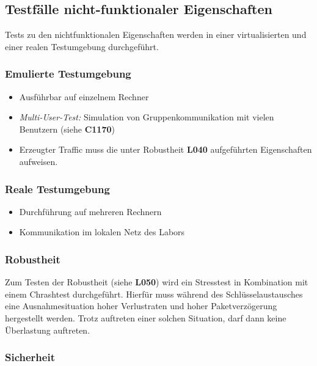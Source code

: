 \subsection{Testfälle nicht-funktionaler Eigenschaften}


Tests zu den nichtfunktionalen Eigenschaften werden in einer virtualisierten und einer realen Testumgebung durchgeführt.


\subsubsection{Emulierte Testumgebung}

	\begin{itemize}
		\item Ausführbar auf einzelnem Rechner 
		\item \textit{Multi-User-Test:} Simulation von Gruppenkommunikation mit vielen Benutzern (siehe \textbf{C1170})
		\item Erzeugter Traffic muss die unter {\color{glossb}Robustheit} \textbf{L040} aufgeführten Eigenschaften aufweisen.
	\end{itemize}


\subsubsection{Reale Testumgebung}

	\begin{itemize}
		\item Durchführung auf mehreren Rechnern
		\item Kommunikation im lokalen Netz des Labors
	\end{itemize}

\subsubsection{Robustheit}

Zum Testen der {\color{glossb}Robustheit} (siehe \textbf{L050}) wird ein Stresstest in Kombination mit einem Chrashtest durchgeführt.
Hierfür muss während des Schlüsselaustausches eine Ausnahmesituation hoher Verlustraten und hoher Paketverzögerung hergestellt werden. 
Trotz auftreten einer solchen Situation, darf dann keine Überlastung auftreten.


\subsubsection{Sicherheit}

